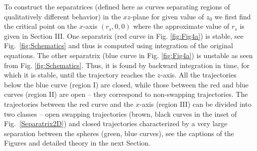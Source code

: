 To construct the separatrices (defined here as curves separating regions of qualitatively different behavior) in the $xz$-plane for given value of $z_0$ we first
find the critical point on the $x$-axis $(r_s,0,0)$ where the approximate value of $r_s$ is given in Section III.
One separatrix (red curve in Fig. \ref{fig:Fig4a}) is stable, see Fig.~\ref{fig:Schematics} and thus is computed
using integration of the original equations. The other separatrix (blue curve in Fig. \ref{fig:Fig4a}) is unstable as seen from Fig. \ref{fig:Schematics}. Thus, it is
found by
backward integration in time, for which it is stable, until the trajectory reaches the $z$-axis. All the trajectories below the blue curve (region I) are closed, while
those between the red and blue curves (region II) are open -- they correspond to
non-swapping trajectories. The trajectories between the red curve and the $x$-axis (region III)
can be divided into two classes -- open swapping trajectories (brown, black curves in the inset of Fig.~\ref{Separatrix2D}) and closed trajectories characterized by a
very large separation between the spheres (green, blue curves), see the captions of the Figures and detailed theory in the next Section.



